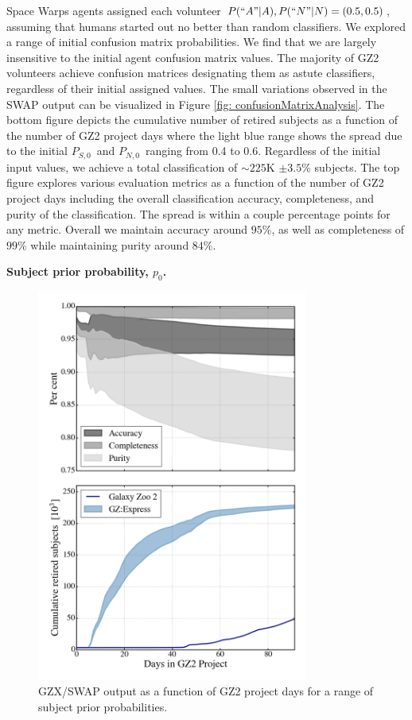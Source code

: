 \documentclass[twocolumn]{aastex6}
\newcommand{\Ps}{$P_{S,0}$}
\newcommand{\Pn}{$P_{N,0}$}
\newcommand{\p}{$p_0$}
\begin{document}
Space Warps agents assigned each volunteer $P(``A"|A), P(``N"|N) = (0.5, 0.5)$, 
assuming that humans started out no better than random classifiers.  We explored a range
of initial confusion matrix probabilities. We find that we are largely insensitive to the 
initial agent confusion matrix values.  The majority of GZ2 volunteers achieve confusion
matrices designating them as astute classifiers, regardless of their initial assigned values. 
The  small variations observed in the SWAP output can be visualized in 
Figure \ref{fig: confusionMatrixAnalysis}. The bottom figure depicts the cumulative 
number of retired subjects as a function of the number of GZ2 project days where the light blue range 
shows the spread due to the initial \Ps~and \Pn~ranging from 0.4 to 0.6. 
Regardless of the initial input values, we achieve a total classification of $\sim225$K  $\pm 3.5\%$ subjects. 
The top figure explores various evaluation metrics as a function of the number of 
GZ2 project days including the overall classification accuracy, completeness, and 
purity of the classification. The spread is within a couple percentage points for any
metric. Overall we maintain accuracy around $95\%$, as well as completeness of $99\%$
while maintaining purity around $84\%$. 

\textbf{Subject prior probability, \p.}
\begin{figure}[t!]
\includegraphics[width=3.5in]{figures/GZX_eval_and_retirement_prior_spread_4paper.png}
\caption{GZX/SWAP output as a function of GZ2 project days for a range of subject prior probabilities.  \label{fig: priorAnalysis}}
\end{figure}
\end{document}
